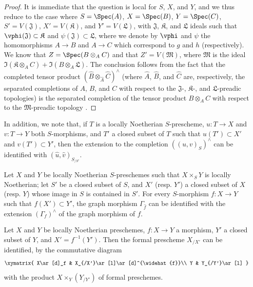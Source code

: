 \begin{proof}
It is immediate that the question is local for $S$, $X$, and $Y$, and we thus reduce to the case where $S=\Spec(A)$, $X=\Spec(B)$, $Y=\Spec(C)$, $S'=V(\mathfrak{J})$, $X'=V(\mathfrak{K})$, and $Y'=V(\mathfrak{L})$, with $\mathfrak{J}$, $\mathfrak{K}$, and $\mathfrak{L}$ ideals such that $\vphi(\mathfrak{J})\subset\mathfrak{K}$ and $\psi(\mathfrak{J})\subset\mathfrak{L}$, where we denote by $\vphi$ and $\psi$ the homomorphisms $A\to B$ and $A\to C$ which correspond to $g$ and $h$ (respectively).
We know that $Z=\Spec(B\otimes_A C)$ and that $Z'=V(\mathfrak{M})$, where $\mathfrak{M}$ is the ideal $\Im(\mathfrak{K}\otimes_A C)+\Im(B\otimes_A\mathfrak{L})$.
The conclusion follows  from the fact that the completed tensor product $(\widehat{B}\otimes_{\widehat{A}}\widehat{C})^\wedge$ (where $\widehat{A}$, $\widehat{B}$, and $\widehat{C}$ are, respectively, the separated completions of $A$, $B$, and $C$ with respect to the $\mathfrak{J}$-, $\mathfrak{K}$-, and $\mathfrak{L}$-preadic topologies) is the separated completion of the tensor product $B\otimes_A C$ with respect to the $\mathfrak{M}$-preadic topology .
\end{proof}

In addition, we note that, if $T$ is a locally Noetherian $S$-prescheme, $u:T\to X$ and $v:T\to Y$ both $S$-morphisms, and $T'$ a closed subset of $T$ such that $u(T')\subset X'$ and $v(T')\subset Y'$, then the extension to the completion $((u,v)_S)^\wedge$ can be identified with $(\widehat{u},\widehat{v})_{S_{/S'}}$.

\begin{corollary}[10.9.8]
\label{I.10.9.8}
Let $X$ and $Y$ be locally Noetherian $S$-preschemes such that $X\times_S Y$ is locally Noetherian; let $S'$ be a closed subset of $S$, and $X'$ (resp. $Y'$) a closed subset of $X$ (resp. $Y$) whose image in $S$ is contained in $S'$.
For every $S$-morphism $f:X\to Y$ such that $f(X')\subset Y'$, the graph morphism $\Gamma_{\widehat{f}}$ can be identified with the extension $(\Gamma_f)^\wedge$ of the graph morphism of $f$.
\end{corollary}

\begin{corollary}[10.9.9]
\label{I.10.9.9}
Let $X$ and $Y$ be locally Noetherian preschemes, $f:X\to Y$ a morphism, $Y'$ a closed subset of $Y$, and $X'=f^{-1}(Y')$.
Then the formal prescheme $X_{/X'}$ can be identified, by the commutative diagram
\[
  \xymatrix{
    X\ar[d]_f &
    X_{/X'}\ar[l]\ar[d]^{\widehat{f}}\\
    Y &
    Y_{/Y'}\ar[l]
  }
\]
with the product $X\times_Y(Y_{/Y'})$ of formal preschemes.
\end{corollary}

